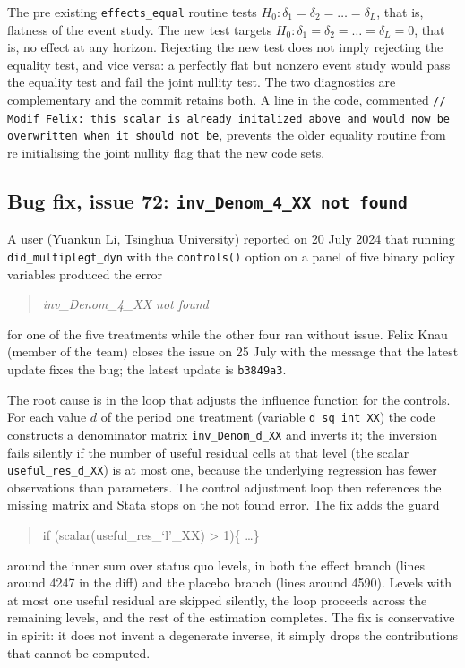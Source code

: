  The pre existing \texttt{effects\_equal} routine tests $H_0: \delta_1 = \delta_2 = \dots = \delta_L$, that is, flatness of the event study. The new test targets $H_0: \delta_1 = \delta_2 = \dots = \delta_L = 0$, that is, no effect at any horizon. Rejecting the new test does not imply rejecting the equality test, and vice versa: a perfectly flat but nonzero event study would pass the equality test and fail the joint nullity test. The two diagnostics are complementary and the commit retains both. A line in the code, commented \texttt{// Modif Felix: this scalar is already initalized above and would now be overwritten when it should not be}, prevents the older equality routine from re initialising the joint nullity flag that the new code sets.

\subsection*{Bug fix, issue 72: \texttt{inv\_Denom\_4\_XX not found}}

A user (Yuankun Li, Tsinghua University) reported on 20 July 2024 that running \texttt{did\_multiplegt\_dyn} with the \texttt{controls()} option on a panel of five binary policy variables produced the error
\begin{quote}\small\itshape
inv\_Denom\_4\_XX not found
\end{quote}
for one of the five treatments while the other four ran without issue. Felix Knau (member of the team) closes the issue on 25 July with the message that the latest update fixes the bug; the latest update is \texttt{b3849a3}.

The root cause is in the loop that adjusts the influence function for the controls. For each value $d$ of the period one treatment (variable \texttt{d\_sq\_int\_XX}) the code constructs a denominator matrix \texttt{inv\_Denom\_d\_XX} and inverts it; the inversion fails silently if the number of useful residual cells at that level (the scalar \texttt{useful\_res\_d\_XX}) is at most one, because the underlying regression has fewer observations than parameters. The control adjustment loop then references the missing matrix and Stata stops on the not found error. The fix adds the guard
\begin{quote}\small\ttfamily
if (scalar(useful\_res\_`l'\_XX) > 1)\{ \ldots \}
\end{quote}
around the inner sum over status quo levels, in both the effect branch (lines around 4247 in the diff) and the placebo branch (lines around 4590). Levels with at most one useful residual are skipped silently, the loop proceeds across the remaining levels, and the rest of the estimation completes. The fix is conservative in spirit: it does not invent a degenerate inverse, it simply drops the contributions that cannot be computed.

